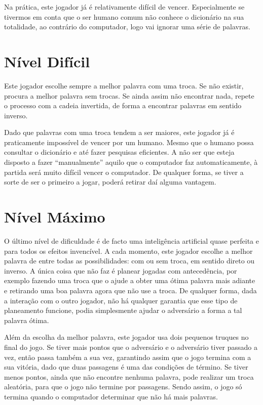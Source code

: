 \documentclass[12pt,a4paper,reqno]{report}
\numberwithin{equation}{section}
\begin{document}
Na prática, este jogador já é relativamente difícil de vencer. Especialmente se tivermos em conta que o ser humano comum não conhece o dicionário na sua totalidade, ao contrário do computador, logo vai ignorar uma série de palavras.

\section {Nível Difícil}

Este jogador escolhe sempre a melhor palavra com uma troca. Se não existir, procura a melhor palavra sem trocas. Se ainda assim não encontrar nada, repete o processo com a cadeia invertida, de forma a encontrar palavras em sentido inverso.

Dado que palavras com uma troca tendem a ser maiores, este jogador já é praticamente impossível de vencer por um humano. Mesmo que o humano possa consultar o dicionário e até fazer pesquisas eficientes. A não ser que esteja disposto a fazer ``manualmente'' aquilo que o computador faz automaticamente, à partida será muito difícil vencer o computador. De qualquer forma, se tiver a sorte de ser o primeiro a jogar, poderá retirar daí alguma vantagem.

\section {Nível Máximo}

O último nível de dificuldade é de facto uma inteligência artificial quase perfeita e para todos os efeitos invencível. A cada momento, este jogador escolhe a melhor palavra de entre todas as possibilidades: com ou sem troca, em sentido direto ou inverso. A única coisa que não faz é planear jogadas com antecedência, por exemplo fazendo uma troca que o ajude a obter uma ótima palavra mais adiante e retirando uma boa palavra agora que não use a troca. De qualquer forma, dada a interação com o outro jogador, não há qualquer garantia que esse tipo de planeamento funcione, podia simplesmente ajudar o adversário a forma a tal palavra ótima.

Além da escolha da melhor palavra, este jogador usa dois pequenos truques no final do jogo. Se tiver mais pontos que o adversário e o adversário tiver passado a vez, então passa também a sua vez, garantindo assim que o jogo termina com a sua vitória, dado que duas passagens é uma das condições de término. Se tiver menos pontos, ainda que não encontre nenhuma palavra, pode realizar um troca aleatória, para que o jogo não termine por passagens. Sendo assim, o jogo só termina quando o computador determinar que não há mais palavras.
\end{document}
